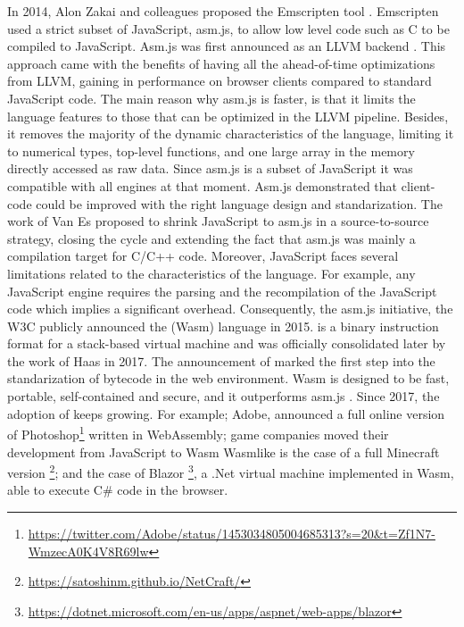 In 2014, Alon Zakai and colleagues proposed the Emscripten tool \cite{emscripten}. Emscripten used a strict subset of JavaScript, asm.js, to allow low level code such as C to be compiled to JavaScript. Asm.js was first announced as an LLVM backend \cite{asmjsweb}. This approach came with the benefits of having all the ahead-of-time optimizations from LLVM, gaining in performance on browser clients \cite{asmjs} compared to standard JavaScript code. The main reason why asm.js is faster, is that it limits the language features to those that can be optimized in the LLVM pipeline. Besides, it removes the majority of the dynamic characteristics of the language, limiting it to numerical types, top-level functions, and one large array in the memory directly accessed as raw data. Since asm.js is a subset of JavaScript it was compatible with all engines at that moment. Asm.js demonstrated that client-code could be improved with the right language design and standarization.
The work of Van Es \etal \cite{EsAsm.js} proposed to shrink JavaScript to asm.js in a source-to-source strategy, closing the cycle and extending the fact that asm.js was mainly a compilation target for C/C++ code. 
%
Moreover, JavaScript faces several limitations related to the characteristics of the language. For example, any JavaScript engine requires the parsing and the recompilation of the JavaScript code which implies a significant overhead.
Consequently, the asm.js initiative, the W3C publicly announced the \wasm (Wasm) language in 2015. \wasm is a binary instruction format for a stack-based virtual machine and was officially consolidated later by the work of Haas \etal \cite{Haas_2017} in 2017. The announcement of \wasm marked the first step into the standarization of bytecode in the web environment. Wasm  is designed to be fast, portable, self-contained and secure, and it outperforms asm.js \cite{Haas_2017}. Since 2017, the adoption of \wasm keeps growing. For example; Adobe, announced a full online version of Photoshop\footnote{\url{https://twitter.com/Adobe/status/1453034805004685313?s=20&t=Zf1N7-WmzecA0K4V8R69lw}} written in WebAssembly;  game companies moved their development from JavaScript to Wasm  {Wasm}like is the case of a full Minecraft version \footnote{\url{https://satoshinm.github.io/NetCraft/}}; and the case of Blazor \footnote{\url{https://dotnet.microsoft.com/en-us/apps/aspnet/web-apps/blazor}}, a .Net virtual machine implemented in Wasm, able to execute C\# code in the browser.

